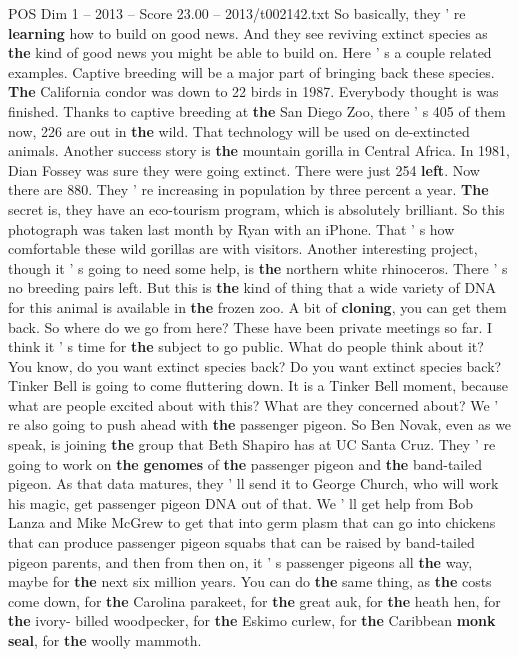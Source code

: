 \begin{textsample}{POS Dim 1 – 2013 – Score 23.00 – 2013/t002142.txt}
So basically, they ' re \textbf{learning} how to build on good news.
And they see reviving extinct species as \textbf{the} kind of good news you might be able to build on.
Here ' s a couple related examples.
Captive breeding will be a major part of bringing back these species. \textbf{The} California condor was down to 22 birds in 1987.
Everybody thought is was finished.
Thanks to captive breeding at \textbf{the} San Diego Zoo, there ' s 405 of them now, 226 are out in \textbf{the} wild.
That technology will be used on de-extincted animals.
Another success story is \textbf{the} mountain gorilla in Central Africa.
In 1981, Dian Fossey was sure they were going extinct.
There were just 254 \textbf{left}.
Now there are 880.
They ' re increasing in population by three percent a year. \textbf{The} secret is, they have an eco-tourism program, which is absolutely brilliant.
So this photograph was taken last month by Ryan with an iPhone.
That ' s how comfortable these wild gorillas are with visitors.
Another interesting project, though it ' s going to need some help, is \textbf{the} northern white rhinoceros.
There ' s no breeding pairs left.
But this is \textbf{the} kind of thing that a wide variety of DNA for this animal is available in \textbf{the} frozen zoo.
A bit of \textbf{cloning}, you can get them back.
So where do we go from here?
These have been private meetings so far.
I think it ' s time for \textbf{the} subject to go public.
What do people think about it?
You know, do you want extinct species back?
Do you want extinct species back?
Tinker Bell is going to come fluttering down.
It is a Tinker Bell moment, because what are people excited about with this?
What are they concerned about?
We ' re also going to push ahead with \textbf{the} passenger pigeon.
So Ben Novak, even as we speak, is joining \textbf{the} group that Beth Shapiro has at UC Santa Cruz.
They ' re going to work on \textbf{the} \textbf{genomes} of \textbf{the} passenger pigeon and \textbf{the} band-tailed pigeon.
As that data matures, they ' ll send it to George Church, who will work his magic, get passenger pigeon DNA out of that.
We ' ll get help from Bob Lanza and Mike McGrew to get that into germ plasm that can go into chickens that can produce passenger pigeon squabs that can be raised by band-tailed pigeon parents, and then from then on, it ' s passenger pigeons all \textbf{the} way, maybe for \textbf{the} next six million years.
You can do \textbf{the} same thing, as \textbf{the} costs come down, for \textbf{the} Carolina parakeet, for \textbf{the} great auk, for \textbf{the} heath hen, for \textbf{the} ivory- billed woodpecker, for \textbf{the} Eskimo curlew, for \textbf{the} Caribbean \textbf{monk} \textbf{seal}, for \textbf{the} woolly mammoth.

\end{textsample}
